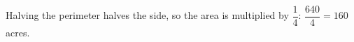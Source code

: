 Halving the perimeter halves the side, so the area is multiplied by $\dfrac{1}{4}$: $\dfrac{640}{4}=\boxed{160}$ acres.
